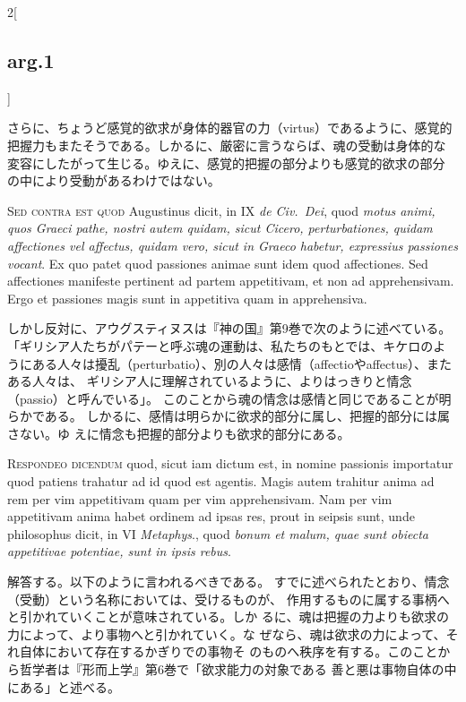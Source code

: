 \documentclass[paper=a4paper,fontsize=10pt,jafontsize=9pt,titlepage]{jlreq}
\begin{document}
\begin{paracol}{2}[\subsection{arg.1}]
\switchcolumn

さらに、ちょうど感覚的欲求が身体的器官の力（virtus）であるように、感覚的
 把握力もまたそうである。しかるに、厳密に言うならば、魂の受動は身体的な
 変容にしたがって生じる。ゆえに、感覚的把握の部分よりも感覚的欲求の部分
 の中により受動があるわけではない。

\switchcolumn*[\subsection{s.c.}]

{\scshape Sed contra est quod} Augustinus dicit, in IX {\itshape de
 Civ.~Dei}, quod {\itshape motus
 animi, quos Graeci pathe, nostri autem quidam, sicut Cicero,
 perturbationes, quidam affectiones vel affectus, quidam vero, sicut in
 Graeco habetur, expressius passiones vocant}. Ex quo patet quod
 passiones animae sunt idem quod affectiones. Sed affectiones manifeste
 pertinent ad partem appetitivam, et non ad apprehensivam. Ergo et
 passiones magis sunt in appetitiva quam in apprehensiva.

\switchcolumn

しかし反対に、アウグスティヌスは『神の国』第9巻で次のように述べている。
 「ギリシア人たちがパテーと呼ぶ魂の運動は、私たちのもとでは、キケロのよ
 うにある人々は擾乱（perturbatio）、別の人々は感情（affectioやaffectus）、またある人々は、
 ギリシア人に理解されているように、よりはっきりと情念（passio）と呼んでいる」。
 このことから魂の情念は感情と同じであることが明らかである。
しかるに、感情は明らかに欲求的部分に属し、把握的部分には属さない。ゆ
 えに情念も把握的部分よりも欲求的部分にある。


{\scshape Respondeo dicendum} quod, sicut iam dictum est, in nomine passionis
 importatur quod patiens trahatur ad id quod est agentis. Magis autem
 trahitur anima ad rem per vim appetitivam quam per vim
 apprehensivam. Nam per vim appetitivam anima habet ordinem ad ipsas
 res, prout in seipsis sunt, unde philosophus dicit, in VI {\itshape Metaphys}.,
 quod {\itshape bonum et malum, quae sunt obiecta appetitivae potentiae, sunt in
 ipsis rebus}.

\switchcolumn

解答する。以下のように言われるべきである。
すでに述べられたとおり、情念（受動）という名称においては、受けるものが、
 作用するものに属する事柄へと引かれていくことが意味されている。しか
 るに、魂は把握の力よりも欲求の力によって、より事物へと引かれていく。な
 ぜなら、魂は欲求の力によって、それ自体において存在するかぎりでの事物そ
 のものへ秩序を有する。このことから哲学者は『形而上学』第6巻で「欲求能力の対象である
 善と悪は事物自体の中にある」と述べる。


\end{paracol}
\end{document}
